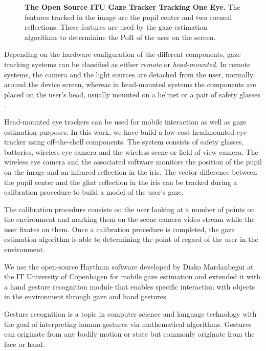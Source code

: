 \documentclass[jou,a4paper,notxfonts]{apa}
\begin{document}
\begin{figure}[tp]
 \caption{\textbf{The Open Source ITU Gaze Tracker Tracking One Eye.} The
features tracked in the image are the pupil center and two corneal reflections. These features are used by the gaze 
estimation algorithms to determinine the PoR of the user on the screen.}
 \label{screenGazeTracker}
\end{figure}

Depending on the hardware configuration of the different components, gaze tracking systems can be classified as either
\textit{remote} or \textit{head-mounted}. In remote systems, the camera and the light sources are detached from the
user, normally around the device screen, whereas in head-mounted systems the components are placed on the user's head, usually
mounted on a helmet or a pair of safety glasses \cite{lowcostitugazetracker}.

Head-mounted eye trackers can be used for mobile interaction as well as gaze estimation purposes.
In this work, we have build a low-cost headmounted eye tracker using off-the-shelf components.  The system consists of
safety glasses, batteries, wireless eye camera and the wireless scene or field of view camera. The wireless eye camera
and the associated software monitors the position of the pupil on the image and an infrared reflection in the iris. The
vector difference between the pupil center and the glint reflection in the iris can be tracked during a calibration
procedure to build a model of the user's gaze.

The calibration procedure consists on the user looking at a number of points on the environment and marking them on
the scene camera video stream while the user fixates on them.  Once a calibration procedure is completed, the gaze
estimation algorithm is able to determining the point of regard of the user in the environment.

We use the open-source Haytham \cite{Mardanbegi2011} software developed by Diako Mardanbegui at the IT University of
Copenhagen for mobile gaze estimation and extended it with a hand gesture recognition module that enables specific
interaction with objects in the environment through gaze and hand gestures.

Gesture recognition is a topic in computer science and language technology with the goal of interpreting human gestures
via mathematical algorithms. Gestures can originate from any bodily motion or state but commonly originate from the face
or hand.
\end{document}
